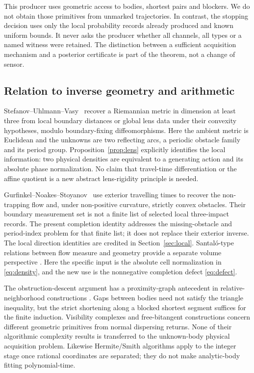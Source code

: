 This producer uses geometric access to bodies, shortest pairs and blockers.
We do not obtain those primitives from unmarked trajectories. In contrast,
the stopping decision uses only the local probability records already
produced and known uniform bounds. It never asks the producer whether
all channels, all types or a named witness were retained. The distinction
between a sufficient acquisition mechanism and a posterior certificate
is part of the theorem, not a change of sensor.

\subsection{Relation to inverse geometry and arithmetic}
Stefanov--Uhlmann--Vasy~\cite[Theorems 1.1 and 1.3]{SUV} recover a
Riemannian metric in dimension at least three from local boundary distances
or global lens data under their convexity hypotheses, modulo boundary-fixing
diffeomorphisms. Here the ambient metric is Euclidean and the unknowns are
two reflecting arcs, a periodic obstacle family and its period group.
Proposition~\ref{prop:lens} explicitly identifies the local information:
two physical densities are equivalent to a generating action and its
absolute phase normalization. No claim that travel-time differentiation
or the affine quotient is a new abstract lens-rigidity principle is needed.

Gurfinkel--Noakes--Stoyanov~\cite[Theorems 1 and 2]{GNS} use exterior
travelling times to recover the non-trapping flow and, under non-positive
curvature, strictly convex obstacles. Their boundary measurement set is
not a finite list of selected local three-impact records. The present
completion identity addresses the missing-obstacle and period-index
problem for that finite list; it does not replace their exterior inverse.
The local direction identities are credited in Section~\ref{sec:local}.
Santal\'o-type relations between flow measure and geometry provide a
separate volume perspective \cite{Santalo}. Here the specific input is
the absolute cell normalization in \eqref{eq:density}, and the new use
is the nonnegative completion defect \eqref{eq:defect}.

The obstruction-descent argument has a proximity-graph antecedent in
relative-neighborhood constructions \cite{Toussaint,JT}. Gaps between
bodies need not satisfy the triangle inequality, but the strict shortening
along a blocked shortest segment suffices for the finite induction.
Visibility complexes and free-bitangent constructions \cite{PV} concern
different geometric primitives from normal dispersing returns. None of
their algorithmic complexity results is transferred to the unknown-body
physical acquisition problem. Likewise Hermite/Smith algorithms
\cite{KB,Cohen} apply to the integer stage once rational coordinates
are separated; they do not make analytic-body fitting polynomial-time.

